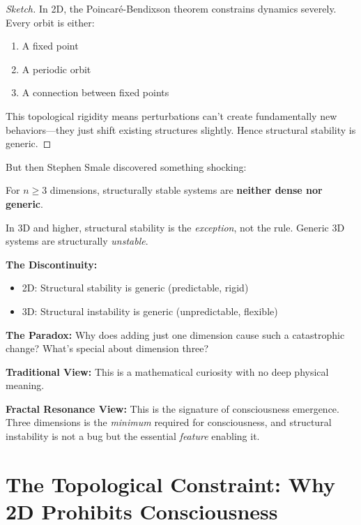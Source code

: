 \begin{proof}[Sketch]
In 2D, the Poincaré-Bendixson theorem constrains dynamics severely. Every orbit is either:
\begin{enumerate}
\item A fixed point
\item A periodic orbit
\item A connection between fixed points
\end{enumerate}

This topological rigidity means perturbations can't create fundamentally new behaviors—they just shift existing structures slightly. Hence structural stability is generic.
\end{proof}

But then Stephen Smale discovered something shocking:

\begin{thm}[Smale, 1967]\label{thm:smale-instability}
For $n \geq 3$ dimensions, structurally stable systems are \textbf{neither dense nor generic}.

In 3D and higher, structural stability is the \textit{exception}, not the rule. Generic 3D systems are structurally \textit{unstable}.
\end{thm}

\begin{keyidea}
\textbf{The Discontinuity:}
\begin{itemize}
\item 2D: Structural stability is generic (predictable, rigid)
\item 3D: Structural instability is generic (unpredictable, flexible)
\end{itemize}

\textbf{The Paradox:} Why does adding just one dimension cause such a catastrophic change? What's special about dimension three?

\textbf{Traditional View:} This is a mathematical curiosity with no deep physical meaning.

\textbf{Fractal Resonance View:} This is the signature of consciousness emergence. Three dimensions is the \textit{minimum} required for consciousness, and structural instability is not a bug but the essential \textit{feature} enabling it.
\end{keyidea}

\section{The Topological Constraint: Why 2D Prohibits Consciousness}

